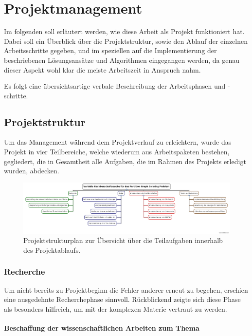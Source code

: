 \chapter{Projektmanagement}

Im folgenden soll erläutert werden, wie diese Arbeit als Projekt funktioniert hat. Dabei soll ein Überblick über die Projektstruktur, sowie den Ablauf der einzelnen Arbeitsschritte gegeben, und im speziellen auf die Implementierung der beschriebenen Lösungsansätze und Algorithmen eingegangen werden, da genau dieser Aspekt wohl klar die meiste Arbeitszeit in Anspruch nahm.

Es folgt eine übersichtsartige verbale Beschreibung der Arbeitsphasen und -schritte.

\section{Projektstruktur}

Um das Management während dem Projektverlauf zu erleichtern, wurde das Projekt in vier Teilbereiche, welche wiederum aus Arbeitspaketen bestehen, gegliedert, die in Gesamtheit alle Aufgaben, die im Rahmen des Projekts erledigt wurden, abdecken.

\begin{figure}
\centering
\includegraphics[angle=90, height=0.9\textheight]{img/psp.png}
\caption[Projektstrukturplan]{Projektstrukturplan zur Übersicht über die Teilaufgaben innerhalb des Projektablaufs.}
\label{fig:psp}
\end{figure}

\subsection{Recherche}
Um nicht bereits zu Projektbeginn die Fehler anderer erneut zu begehen, erschien eine ausgedehnte Recherchephase sinnvoll. Rückblickend zeigte sich diese Phase als besonders hilfreich, um mit der komplexen Materie vertraut zu werden.

\subsubsection{Beschaffung der wissenschaftlichen Arbeiten zum Thema}

